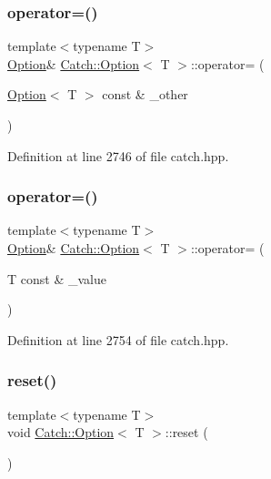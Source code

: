 \subsubsection{\texorpdfstring{operator=()}{operator=()}\hspace{0.1cm}{\footnotesize\ttfamily [1/2]}}
{\footnotesize\ttfamily template$<$typename T$>$ \\
\hyperlink{class_catch_1_1_option}{Option}\& \hyperlink{class_catch_1_1_option}{Catch\+::\+Option}$<$ T $>$\+::operator= (\begin{DoxyParamCaption}\item[{\hyperlink{class_catch_1_1_option}{Option}$<$ T $>$ const \&}]{\+\_\+other }\end{DoxyParamCaption})\hspace{0.3cm}{\ttfamily [inline]}}



Definition at line 2746 of file catch.\+hpp.

\hypertarget{class_catch_1_1_option_a2be7e343ab22d6061726d32ab4622653}{}\label{class_catch_1_1_option_a2be7e343ab22d6061726d32ab4622653} 
\subsubsection{\texorpdfstring{operator=()}{operator=()}\hspace{0.1cm}{\footnotesize\ttfamily [2/2]}}
{\footnotesize\ttfamily template$<$typename T$>$ \\
\hyperlink{class_catch_1_1_option}{Option}\& \hyperlink{class_catch_1_1_option}{Catch\+::\+Option}$<$ T $>$\+::operator= (\begin{DoxyParamCaption}\item[{T const \&}]{\+\_\+value }\end{DoxyParamCaption})\hspace{0.3cm}{\ttfamily [inline]}}



Definition at line 2754 of file catch.\+hpp.

\hypertarget{class_catch_1_1_option_a37b4e0e5d4d56296adacd267a616f4e0}{}\label{class_catch_1_1_option_a37b4e0e5d4d56296adacd267a616f4e0} 
\subsubsection{\texorpdfstring{reset()}{reset()}}
{\footnotesize\ttfamily template$<$typename T$>$ \\
void \hyperlink{class_catch_1_1_option}{Catch\+::\+Option}$<$ T $>$\+::reset (\begin{DoxyParamCaption}{ }\end{DoxyParamCaption})\hspace{0.3cm}{\ttfamily [inline]}}



